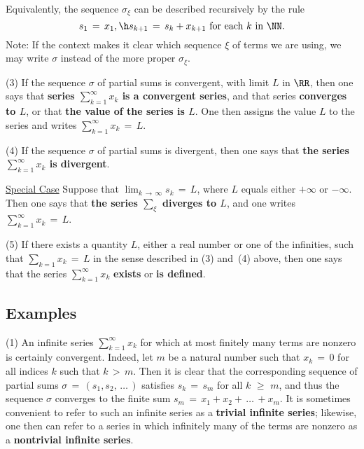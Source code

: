     Equivalently, the sequence ${\sigma}_{{\xi}}$ can be described recursively by the rule
        \begin{displaymath}
        s_{1} \,=\, x_{1}, \h s_{k+1} \,=\, s_{k} + x_{k+1} \mbox{ for each $k$ in ${\NN}$}.
        \end{displaymath}
    Note: If the context makes it clear which sequence ${\xi}$ of terms we are using, we may write ${\sigma}$ instead of the more proper ${\sigma}_{{\xi}}$.

\V

        (3) If the sequence ${\sigma}$ of partial sums is convergent, with limit $L$ in ${\RR}$,
    then one says that {\bf series $\sum_{k=1}^{{\infty}} x_{k}$ is a convergent series},
    and that series {\bf converges to $L$}, or that {\bf the value of the series is $L$}.
    One then assigns the value $L$ to the series and writes $\sum_{k=1}^{{\infty}} x_{k} \,=\, L$.

\V

        (4) If the sequence ${\sigma}$ of partial sums is divergent, then one says that {\bf the series $\sum_{k=1}^{{\infty}} x_{k}$ is divergent}.

        \underline{Special Case} Suppose that $\lim_{k \,{\rightarrow}\, {\infty}} s_{k} \,=\, L$,
    where $L$ equals either $+{\infty}$ or $-{\infty}$.
    Then one says that {\bf the series $\sum_{{\xi}}$ diverges to $L$}, and one writes $\sum_{k=1}^{{\infty}} x_{k} \,=\, L$.

\V

        (5) If there exists a quantity $L$, either a real number or one of the infinities,
    such that $\sum_{k=1} x_{k} \,=\, L$ in the sense described in (3) and~(4) above, then one says that the series $\sum_{k=1}^{{\infty}} x_{k}$ {\bf exists} or {\bf is defined}.

\V
\V

        \subsection{\small{{\bf Examples}}}
        \label{ExampG30.30}

\V

\hspace*{\parindent}(1) An infinite series $\sum_{k=1}^{{\infty}} x_{k}$ for which at most finitely many terms are nonzero is certainly convergent.
    Indeed, let $m$ be a natural number such that $x_{k} \,=\, 0$ for all indices $k$ such that $k\,>\,m$.
    Then it is clear that the corresponding sequence of partial sums ${\sigma} \,=\, (s_{1},s_{2},\,{\ldots}\,)$ satisfies $s_{k} \,=\, s_{m}$ for all $k\,\,{\geq}\,\,m$, and thus the sequence ${\sigma}$ converges to the finite sum $s_{m} \,=\, x_{1}+x_{2}+\,{\ldots}\,+x_{m}$.
    It is sometimes convenient to refer to such an infinite series as a {\bf trivial infinite series};
    likewise, one then can refer to a series in which infinitely many of the terms are nonzero as a {\bf nontrivial infinite series}.
    


